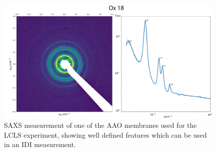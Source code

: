 \begin{figure}[hp!]
	\centering
	\includegraphics[width=0.8\linewidth]{images/ox18.pdf}
	\caption[SAXS of AAO membrane sample]{SAXS measurement of one of the AAO membranes used for the LCLS experiment, showing well defined features which can be used in an IDI measurement.}
	\label{fig:saxsaao}
\end{figure}



